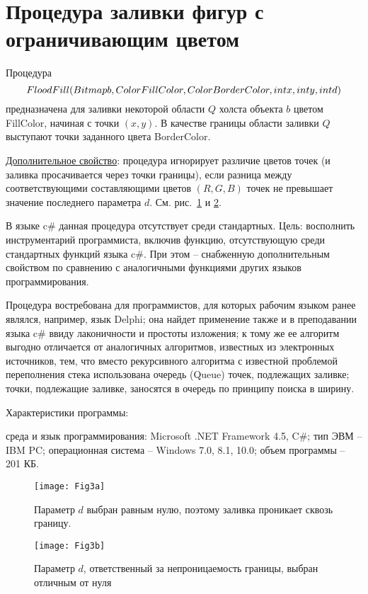 \section{Процедура заливки фигур с ограничивающим цветом}
Процедура \cite{akm-prog3}
$$\small
FloodFill (Bitmap b, Color FillColor, Color BorderColor, int x, int y, int d)
$$
предназначена для заливки некоторой области $Q$ холста объекта $b$ цветом FillColor, начиная с точки $(x,y)$. В качестве границы области заливки $Q$ выступают точки заданного цвета BorderColor.

\underline{Дополнительное свойство}: процедура игнорирует различие цветов точек (и заливка просачивается через точки границы), если разница между соответствующими составляющими цветов $(R, G, B)$ точек не превышает значение последнего параметра $d$. См. рис.\, \ref{MAM_Fig3a} и \ref{MAM_Fig3b}.

В языке c\# данная процедура отсутствует среди стандартных. Цель: восполнить инструментарий программиста, включив функцию, отсутствующую среди стандартных функций языка c\#. При этом – снабженную дополнительным свойством по сравнению с аналогичными функциями других языков программирования.

Процедура востребована для программистов, для которых рабочим языком ранее являлся, например, язык Delphi; она найдет применение также и в преподавании языка c\# ввиду лаконичности и простоты изложения; к тому же ее алгоритм выгодно отличается от аналогичных алгоритмов, известных из электронных источников, тем, что вместо рекурсивного алгоритма с известной проблемой переполнения стека использована очередь (Queue) точек, подлежащих заливке; точки, подлежащие заливке, заносятся в очередь по принципу поиска в ширину.


Характеристики программы:

среда и язык программирования: Microsoft .NET Framework 4.5, C\#;
тип ЭВМ – IBM PC;
операционная система – Windows 7.0, 8.1, 10.0;
объем программы – 201 КБ.

\begin{figure}[h]
  \texttt{[image: Fig3a]}
  \caption{Параметр $d$ выбран равным нулю, поэтому заливка проникает сквозь границу.}\label{MAM_Fig3a}
\end{figure}
\par\medskip
\begin{figure}[h]
  \texttt{[image: Fig3b]}
  \caption{Параметр $d$, ответственный за непроницаемость границы, выбран отличным от нуля}\label{MAM_Fig3b}
\end{figure}
\par\medskip
